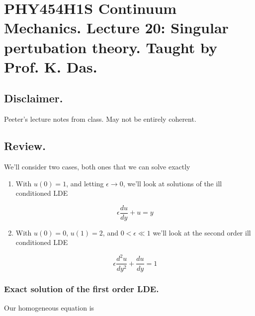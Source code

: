 
%

\chapter{PHY454H1S Continuum Mechanics.  Lecture 20: Singular pertubation theory.  Taught by Prof. K. Das.}
\label{chap:continuumL20}
{}
\date{Mar 28, 2012}

\beginArtWithToc

\section{Disclaimer.}

Peeter's lecture notes from class.  May not be entirely coherent.

\section{Review.}

We'll consider two cases, both ones that we can solve exactly

\begin{enumerate}
\item With $u(0) = 1$, and letting $\epsilon \rightarrow 0$, we'll look at solutions of the ill conditioned LDE

\begin{equation}\label{eqn:continuumL20:10}
\epsilon \frac{du}{dy} + u = y
\end{equation}

\item With $u(0) = 0$, $u(1) = 2$, and $0 < \epsilon \ll 1$ we'll look at the second order ill conditioned LDE

\begin{equation}\label{eqn:continuumL20:30}
\epsilon \frac{d^2u}{dy^2} + \frac{du}{dy} = 1
\end{equation}
\end{enumerate}

\subsection{Exact solution of the first order LDE.}

Our homogeneous equation is 

